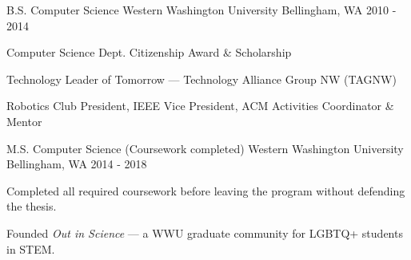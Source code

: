 \documentclass[11pt, a4paper]{awesome-cv}
\begin{document}
\begin{cventries}
  \cventry
  {B.S. Computer Science} %
  {Western Washington University} %
  {Bellingham, WA} %
  {2010 - 2014} %
  {
  \begin{cvitems}
    \item {Computer Science Dept. Citizenship Award \& Scholarship}
    \item {Technology Leader of Tomorrow — Technology Alliance Group NW (TAGNW)}
    \item {Robotics Club President, IEEE Vice President, ACM Activities Coordinator \& Mentor}
  \end{cvitems}
  }
  {}

  \cventry
  {M.S. Computer Science (Coursework completed)} %
  {Western Washington University} %
  {Bellingham, WA} %
  {2014 - 2018} %
  {
  \begin{cvitems}
    \item {Completed all required coursework before leaving the program without defending the thesis.}
    \item {Founded \textit{Out in Science} — a WWU graduate community for LGBTQ+ students in STEM.}
  \end{cvitems}
  }
  {}

\end{cventries}
\end{document}
